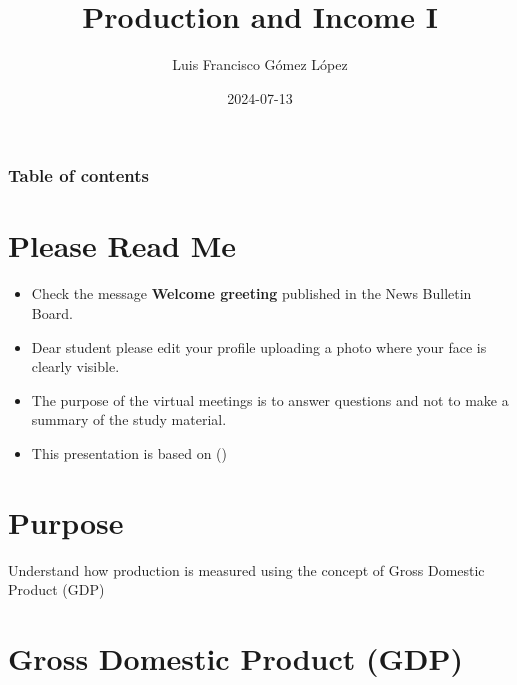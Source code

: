 \documentclass[
  ignorenonframetext,
]{beamer}
\title{Production and Income I}
\author{Luis Francisco Gómez López}
\date{2024-07-13}
\institute{FAEDIS}
\renewcommand*\contentsname{Table of contents}
\newcommand\contentsname{Table of contents}
\begin{document}
\frame{\titlepage}

\renewcommand*\contentsname{Table of contents}
\begin{frame}[allowframebreaks]
  \frametitle{Table of contents}
  \tableofcontents[hideallsubsections]
\end{frame}

\section{Please Read Me}\label{please-read-me}

\begin{frame}{}
\label{section}
\begin{itemize}
\item
  Check the message \textbf{Welcome greeting} published in the News
  Bulletin Board.
\item
  Dear student please edit your profile uploading a photo where your
  face is clearly visible.
\item
  The purpose of the virtual meetings is to answer questions and not to
  make a summary of the study material.
\item
  This presentation is based on
  ()
\end{itemize}
\end{frame}

\section{Purpose}\label{purpose}

\begin{frame}{}
\label{section-1}
Understand how production is measured using the concept of Gross
Domestic Product (GDP)
\end{frame}

\section{Gross Domestic Product (GDP)}\label{gross-domestic-product-gdp}
\end{document}
